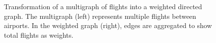 \begin{figure}[h]
    \caption{Transformation of a multigraph of flights into a weighted directed graph. The multigraph (left) represents multiple flights between airports. In the weighted graph (right), edges are aggregated to show total flights as weights.}
    \label{fig:multigraph_to_weighted_graph}
\end{figure}
